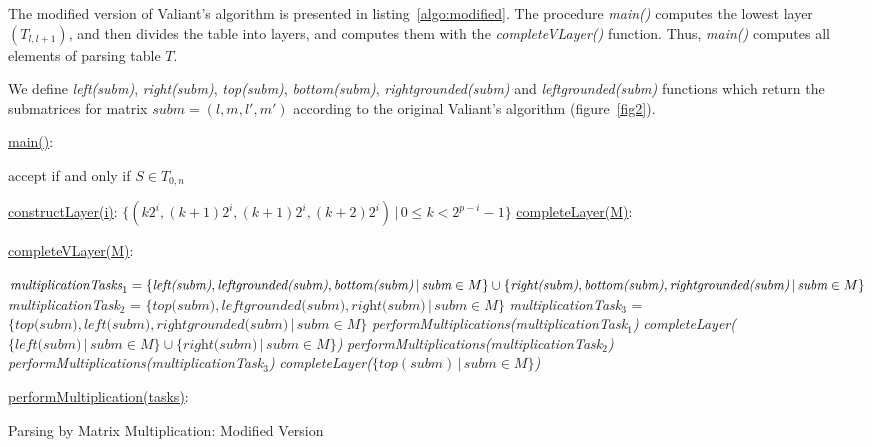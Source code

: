 The modified version of Valiant's algorithm is presented in listing~\ref{algo:modified}.
The procedure \textit{main()} computes the lowest layer $(T_{l, l+1})$, and then divides the table into layers, and computes them with the \textit{completeVLayer()} function.
Thus, \textit{main()} computes all elements of parsing table $T$.

We define \textit{left(subm)}, \textit{right(subm)}, \textit{top(subm)}, \textit{bottom(subm)}, \textit{rightgrounded(subm)} and \textit{leftgrounded(subm)} functions which return the submatrices for matrix $\textit{subm} = (l, m, l', m')$ according to the original Valiant's algorithm (figure~\ref{fig2}).


\begin{algorithm}[!h]
\SetAlgoNoLine
{}
\underline{main()}{:}{

 accept if and only if $S \in T_{0, n}$
 \BlankLine
 }

\underline{constructLayer(i)}{:}{
 \BlankLine
 $\{(k2^i, (k+1)2^i, (k + 1)2^i, (k+2)2^i) \, |\, 0 \le k < 2^{p - i} - 1\}$
 \BlankLine
    }
\underline{completeLayer(M)}{:}{
\BlankLine
{}
\BlankLine
}

\underline{completeVLayer(M)}{:}{
 \BlankLine
 $\textit{multiplicationTasks}_1 = \linebreak
    \{\textit{left(subm)}, \textit{leftgrounded(subm)}, \textit{bottom(subm)}\, 
    |\,\textit{subm} \in M \} \cup \linebreak  \{\textit{right(subm)}, \textit{bottom(subm)}, \textit{rightgrounded(subm)}\, |\,\textit{subm} \in M\}$\;
 \BlankLine
 \textit{multiplicationTask$_2$} = $\{\textit{top(subm)}, \textit{leftgrounded(subm)}, \textit{right(subm)}\, |\,\textit{subm} \in M\}$\;
 \BlankLine
 \textit{multiplicationTask$_3$} = $\{\textit{top(subm)}, \textit{left(subm)}, \textit{rightgrounded(subm)}\, |\,\textit{subm} \in M\}$\;
 \BlankLine
 \textit{performMultiplications(multiplicationTask$_1$)}\;
 \textit{completeLayer($\{\textit{left(subm)}\, |\,subm \in M \} \cup \{\textit{right(subm)}\, |\,\textit{subm} \in M \}$)}\;
 \textit{performMultiplications(multiplicationTask$_2$)}\;
 \textit{performMultiplications(multiplicationTask$_3$)}\;
 \textit{completeLayer($\{top(subm)\, |\,subm \in M \}$)}

 }
 \BlankLine

 \underline{performMultiplication(tasks)}{:}{\\
 }

\caption{Parsing by Matrix Multiplication: Modified Version}
\label{algo:modified}
\end{algorithm}


